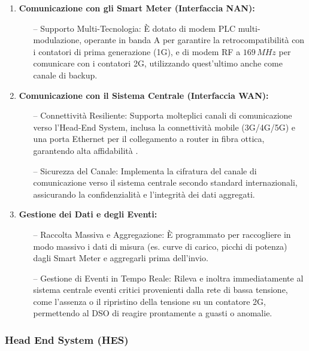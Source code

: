\begin{enumerate}
    \item \textbf{Comunicazione con gli Smart Meter (Interfaccia NAN):}
    \begin{itemize}
        \item[--] Supporto Multi-Tecnologia: È dotato di modem PLC multi-modulazione, operante in banda A per garantire la retrocompatibilità con i contatori di prima generazione (1G), e di modem RF a $169\,MHz$ per comunicare con i contatori 2G, utilizzando quest'ultimo anche come canale di backup.
    \end{itemize}
    
    \item \textbf{Comunicazione con il Sistema Centrale (Interfaccia WAN):}
    \begin{itemize}
        \item[--] Connettività Resiliente: Supporta molteplici canali di comunicazione verso l'Head-End System, inclusa la connettività mobile (3G/4G/5G) e una porta Ethernet per il collegamento a router in fibra ottica, garantendo alta affidabilità \cite{Comunicazione-con-fornitore-areti}.
        \item[--] Sicurezza del Canale: Implementa la cifratura del canale di comunicazione verso il sistema centrale secondo standard internazionali, assicurando la confidenzialità e l'integrità dei dati aggregati.
    \end{itemize}
    
    \item \textbf{Gestione dei Dati e degli Eventi:}
    \begin{itemize}
        \item[--] Raccolta Massiva e Aggregazione: È programmato per raccogliere in modo massivo i dati di misura (es. curve di carico, picchi di potenza) dagli Smart Meter e aggregarli prima dell'invio.
        \item[--] Gestione di Eventi in Tempo Reale: Rileva e inoltra immediatamente al sistema centrale eventi critici provenienti dalla rete di bassa tensione, come l'assenza o il ripristino della tensione su un contatore 2G, permettendo al DSO di reagire prontamente a guasti o anomalie.
    \end{itemize}
\end{enumerate}


\subsubsection{Head End System (HES)}

